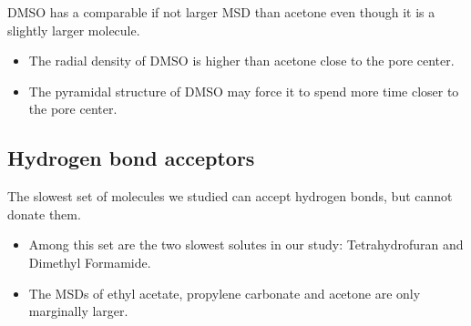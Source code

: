 \documentclass{article}
\begin{document}
  \noindent DMSO has a comparable if not larger MSD than acetone even though it
  is a slightly larger molecule.
  \begin{itemize}
    \item The radial density of DMSO is higher than acetone close to the pore center.
  	\item The pyramidal structure of DMSO may force it to spend more time closer to
  	the pore center.
  \end{itemize}  
  
  \subsection*{Hydrogen bond acceptors}  %

  The slowest set of molecules we studied can accept hydrogen bonds, but cannot donate
  them. 
  \begin{itemize}
  	\item Among this set are the two slowest solutes in our study: Tetrahydrofuran and Dimethyl Formamide.
  	\item The MSDs of ethyl acetate, propylene carbonate and acetone are only marginally larger.
  \end{itemize}  
  
  
\end{document}

